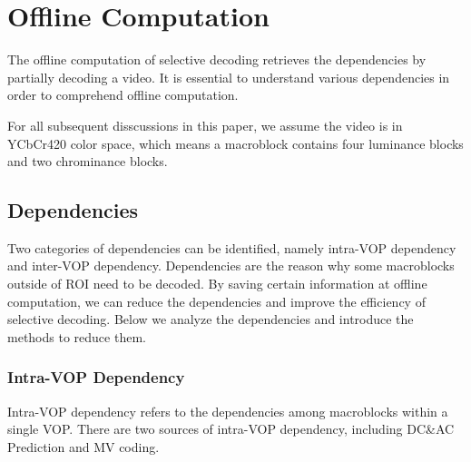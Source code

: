 \section{Offline Computation}
The offline computation of selective decoding retrieves the dependencies by partially decoding a video. It is essential to understand various dependencies in order to comprehend offline computation.

For all subsequent disscussions in this paper, we assume the video is in YCbCr420 color space, which means a macroblock contains four luminance blocks and two chrominance blocks.  

\subsection{Dependencies}
Two categories of dependencies can be identified, namely intra-VOP dependency and inter-VOP dependency. Dependencies are the reason why some macroblocks outside of ROI need to be decoded. By saving certain information at offline computation, we can reduce the dependencies and improve the efficiency of selective decoding. Below we analyze the dependencies and introduce the methods to reduce them. 

\subsubsection{Intra-VOP Dependency}
Intra-VOP dependency refers to the dependencies among macroblocks within a single VOP. There are two sources of intra-VOP dependency, including DC\&AC Prediction and MV coding. 

